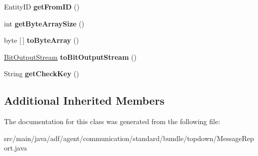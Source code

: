 \begin{DoxyCompactItemize}
\hypertarget{classadf_1_1agent_1_1communication_1_1standard_1_1bundle_1_1topdown_1_1MessageReport_ac62d8cb25b9bfc51d05e6da2d1a51dbb}{}\label{classadf_1_1agent_1_1communication_1_1standard_1_1bundle_1_1topdown_1_1MessageReport_ac62d8cb25b9bfc51d05e6da2d1a51dbb} 
Entity\+ID {\bfseries get\+From\+ID} ()
\item 
\hypertarget{classadf_1_1agent_1_1communication_1_1standard_1_1bundle_1_1topdown_1_1MessageReport_a172ff1c2f44340e4e777ec398ca375b6}{}\label{classadf_1_1agent_1_1communication_1_1standard_1_1bundle_1_1topdown_1_1MessageReport_a172ff1c2f44340e4e777ec398ca375b6} 
int {\bfseries get\+Byte\+Array\+Size} ()
\item 
\hypertarget{classadf_1_1agent_1_1communication_1_1standard_1_1bundle_1_1topdown_1_1MessageReport_a66f8fbce0907e7c1e38393c3eac4f314}{}\label{classadf_1_1agent_1_1communication_1_1standard_1_1bundle_1_1topdown_1_1MessageReport_a66f8fbce0907e7c1e38393c3eac4f314} 
byte \mbox{[}$\,$\mbox{]} {\bfseries to\+Byte\+Array} ()
\item 
\hypertarget{classadf_1_1agent_1_1communication_1_1standard_1_1bundle_1_1topdown_1_1MessageReport_a4be5a027ef35e18fa33f8dd8dee6897d}{}\label{classadf_1_1agent_1_1communication_1_1standard_1_1bundle_1_1topdown_1_1MessageReport_a4be5a027ef35e18fa33f8dd8dee6897d} 
\hyperlink{classadf_1_1component_1_1communication_1_1util_1_1BitOutputStream}{Bit\+Output\+Stream} {\bfseries to\+Bit\+Output\+Stream} ()
\item 
\hypertarget{classadf_1_1agent_1_1communication_1_1standard_1_1bundle_1_1topdown_1_1MessageReport_a2c8543070ef59b266367bedb9e75321f}{}\label{classadf_1_1agent_1_1communication_1_1standard_1_1bundle_1_1topdown_1_1MessageReport_a2c8543070ef59b266367bedb9e75321f} 
String {\bfseries get\+Check\+Key} ()
\end{DoxyCompactItemize}
\subsection*{Additional Inherited Members}


The documentation for this class was generated from the following file\+:\begin{DoxyCompactItemize}
\item 
src/main/java/adf/agent/communication/standard/bundle/topdown/Message\+Report.\+java\end{DoxyCompactItemize}
